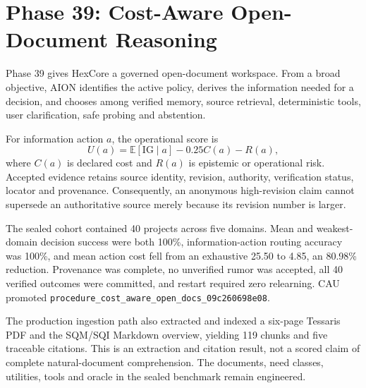 \section{Phase 39: Cost-Aware Open-Document Reasoning}

Phase 39 gives HexCore a governed open-document workspace.  From a broad
objective, AION identifies the active policy, derives the information needed
for a decision, and chooses among verified memory, source retrieval,
deterministic tools, user clarification, safe probing and abstention.

For information action \(a\), the operational score is
\[
U(a)=\mathbb{E}[\mathrm{IG}\mid a]-0.25C(a)-R(a),
\]
where \(C(a)\) is declared cost and \(R(a)\) is epistemic or operational
risk.  Accepted evidence retains source identity, revision, authority,
verification status, locator and provenance.  Consequently, an anonymous
high-revision claim cannot supersede an authoritative source merely because
its revision number is larger.

The sealed cohort contained 40 projects across five domains.  Mean and
weakest-domain decision success were both 100\%, information-action routing
accuracy was 100\%, and mean action cost fell from an exhaustive 25.50 to
4.85, an 80.98\% reduction.  Provenance was complete, no unverified rumor was
accepted, all 40 verified outcomes were committed, and restart required zero
relearning.  CAU promoted
\texttt{procedure\_cost\_aware\_open\_docs\_09c260698e08}.

The production ingestion path also extracted and indexed a six-page Tessaris
PDF and the SQM/SQI Markdown overview, yielding 119 chunks and five traceable
citations.  This is an extraction and citation result, not a scored claim of
complete natural-document comprehension.  The documents, need classes,
utilities, tools and oracle in the sealed benchmark remain engineered.
